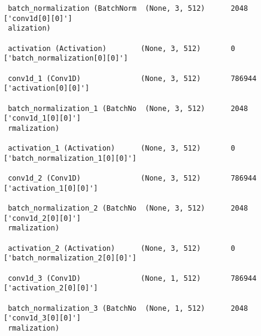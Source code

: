 \documentclass[12pt]{article}
\begin{document}
\begin{redenum}
\begin{itemize}
\begin{itemize}
\begin{center}
\begin{BVerbatim}
 batch_normalization (BatchNorm  (None, 3, 512)      2048        ['conv1d[0][0]']                 
 alization)                                                                                       
                                                                                                  
 activation (Activation)        (None, 3, 512)       0           ['batch_normalization[0][0]']    
                                                                                                  
 conv1d_1 (Conv1D)              (None, 3, 512)       786944      ['activation[0][0]']             
                                                                                                  
 batch_normalization_1 (BatchNo  (None, 3, 512)      2048        ['conv1d_1[0][0]']               
 rmalization)                                                                                     
                                                                                                  
 activation_1 (Activation)      (None, 3, 512)       0           ['batch_normalization_1[0][0]']  
                                                                                                  
 conv1d_2 (Conv1D)              (None, 3, 512)       786944      ['activation_1[0][0]']           
                                                                                                  
 batch_normalization_2 (BatchNo  (None, 3, 512)      2048        ['conv1d_2[0][0]']               
 rmalization)                                                                                     
                                                                                                  
 activation_2 (Activation)      (None, 3, 512)       0           ['batch_normalization_2[0][0]']  
                                                                                                  
 conv1d_3 (Conv1D)              (None, 1, 512)       786944      ['activation_2[0][0]']           
                                                                                                  
 batch_normalization_3 (BatchNo  (None, 1, 512)      2048        ['conv1d_3[0][0]']               
 rmalization)                                                                                     
                                                                                                  

\end{BVerbatim}
\end{center}
\end{itemize}
\end{itemize}
\end{redenum}
\end{document}
